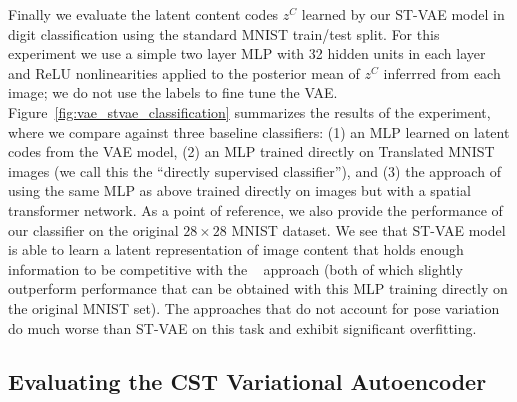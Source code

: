 Finally we evaluate the latent content codes $z^C$ learned by our ST-VAE model 
in digit classification using the standard MNIST train/test split.  For this experiment
we use a simple two layer MLP with 32 hidden units in each layer and
ReLU nonlinearities
applied to the posterior mean of $z^C$ inferrred from each image; we
do not use the labels to fine tune the VAE.
Figure~\ref{fig:vae_stvae_classification} summarizes the results of the experiment, where we
compare against three baseline classifiers: (1) an MLP learned on latent codes from the VAE model,
(2) an MLP trained directly on Translated MNIST images (we call this the ``directly supervised classifier''), 
and (3) the approach of~\cite{jaderberg2015spatial} using the same MLP as above trained directly
on images but with a spatial transformer network.
As a point of reference, we also provide the performance of our classifier on the original $28\times 28$ MNIST
dataset.  We see that ST-VAE model is able to learn a latent representation of image content that holds enough information
to be competitive with the ~\cite{jaderberg2015spatial} approach (both of which slightly outperform performance
that can be obtained with this MLP training directly on the original MNIST set).  The approaches that do not account for
pose variation do much worse than ST-VAE on this task and exhibit significant overfitting.


\subsection{Evaluating the CST Variational Autoencoder}




